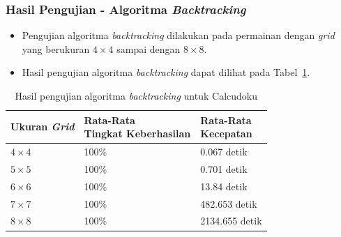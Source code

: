 \documentclass{beamer}
\begin{document}
\begin{frame}
\frametitle{Hasil Pengujian - Algoritma \textit{Backtracking}}
\begin{itemize}
\item Pengujian algoritma \textit{backtracking} dilakukan pada permainan dengan \textit{grid} yang berukuran \begin{math}4 \times 4\end{math} sampai dengan \begin{math}8 \times 8\end{math}.
\item Hasil pengujian algoritma \textit{backtracking} dapat dilihat pada Tabel~\ref{tab:pengujianbt}.
\end{itemize}
\begin{table}
\tiny
\centering
\captionsetup{justification=centering}
\caption[Hasil pengujian algoritma \textit{backtracking} untuk Calcudoku]{Hasil pengujian algoritma \textit{backtracking} untuk Calcudoku}
\begin{tabular}{| l | l | l |}
\hline
Ukuran \textit{Grid} & \makecell[c]{Rata-Rata \\ Tingkat Keberhasilan} & \makecell[c]{Rata-Rata \\ Kecepatan} \\
\hline \hline
\begin{math}4 \times 4\end{math} & 100\% & 0.067 detik \\
\hline
\begin{math}5 \times 5\end{math} & 100\% & 0.701 detik \\
\hline
\begin{math}6 \times 6\end{math} & 100\% & 13.84 detik \\
\hline
\begin{math}7 \times 7\end{math} & 100\% & 482.653 detik \\
\hline
\begin{math}8 \times 8\end{math} & 100\% & 2134.655 detik \\
\hline
\end{tabular}
\label{tab:pengujianbt}
\end{table}
\end{frame}

\end{document}
